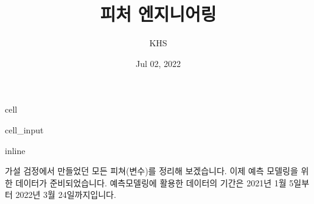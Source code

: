 \documentclass[letterpaper,10pt,english]{jupyterBook}
\title{피처 엔지니어링}
\date{Jul 02, 2022}
\author{KHS}
\begin{document}
\pagestyle{empty}
\sphinxmaketitle
\pagestyle{plain}
\sphinxtableofcontents
\pagestyle{normal}
\label{\detokenize{chapter5/5.2.1_Feature_Engineering::doc}}
\begin{sphinxuseclass}{cell}\begin{sphinxVerbatimInput}

\begin{sphinxuseclass}{cell_input}
\begin{sphinxVerbatim}[commandchars=\\\{\}]
   
 inline
   
   
   

  
\end{sphinxVerbatim}

\end{sphinxuseclass}\end{sphinxVerbatimInput}

\end{sphinxuseclass}


\sphinxAtStartPar
가설 검정에서 만들었던 모든 피쳐(변수)를 정리해 보겠습니다. 이제 예측 모델링을 위한 데이터가 준비되었습니다. 예측모델링에 활용한 데이터의 기간은 2021년 1월 5일부터 2022년 3월 24일까지입니다.
\end{document}
